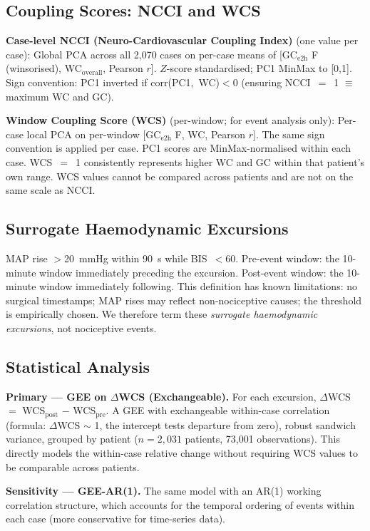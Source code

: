 \documentclass[fleqn,10pt,lineno]{wlpeerj}
\begin{document}
\subsection{Coupling Scores: NCCI and WCS}

\textbf{Case-level NCCI (Neuro-Cardiovascular Coupling Index)} (one value per case): Global PCA across all 2,070 cases on per-case
means of [GC$_\text{e2h}$ F (winsorised), WC$_\text{overall}$, Pearson $r$]. $Z$-score
standardised; PC1 MinMax to [0,1]. Sign convention: PC1 inverted if corr(PC1,~WC)$<$0
(ensuring NCCI~$=$~1 $\equiv$ maximum WC and GC).

\textbf{Window Coupling Score (WCS)} (per-window; for event analysis only): Per-case local PCA
on per-window [GC$_\text{e2h}$ F, WC, Pearson $r$]. The same sign convention is applied per
case. PC1 scores are MinMax-normalised within each case. WCS~$=$~1 consistently represents
higher WC and GC within that patient's own range. WCS values cannot be compared across
patients and are not on the same scale as NCCI.

\subsection{Surrogate Haemodynamic Excursions}

MAP rise $>$20~mmHg within 90~s while BIS~$<$60. Pre-event window: the 10-minute window
immediately preceding the excursion. Post-event window: the 10-minute window immediately
following. This definition has known limitations: no surgical timestamps; MAP rises may
reflect non-nociceptive causes; the threshold is empirically chosen. We therefore term these
\textit{surrogate haemodynamic excursions}, not nociceptive events.

\subsection{Statistical Analysis}

\textbf{Primary --- GEE on $\Delta$WCS (Exchangeable).} For each excursion, $\Delta$WCS
$=$ WCS$_\text{post}$ $-$ WCS$_\text{pre}$. A GEE with exchangeable within-case correlation
\citep{liang1986} (formula: $\Delta$WCS $\sim$ 1, the intercept tests departure from zero),
robust sandwich variance, grouped by patient ($n = 2{,}031$ patients, 73,001 observations).
This directly models the within-case relative change without requiring WCS values to be
comparable across patients.

\textbf{Sensitivity --- GEE-AR(1).} The same model with an AR(1) working correlation
structure, which accounts for the temporal ordering of events within each case (more
conservative for time-series data).
\end{document}
